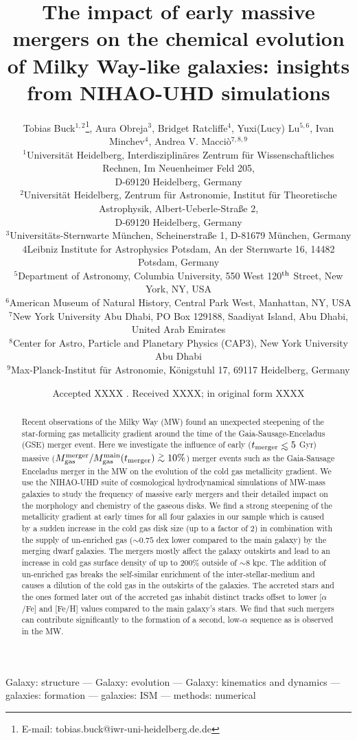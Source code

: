 \documentclass[useAMS,usenatbib]{mnras}
\title[Early massive accretion events in MW-mass galaxies]{The impact of early massive mergers on the chemical evolution of Milky Way-like galaxies: insights from NIHAO-UHD simulations}
\author[T. Buck] {Tobias Buck$^{1,2}$\thanks{E-mail: tobias.buck@iwr-uni-heidelberg.de.de}, Aura Obreja$^{3}$, Bridget Ratcliffe$^{4}$, Yuxi(Lucy) Lu$^{5, 6}$, 
\newauthor Ivan Minchev$^{4}$, Andrea V. Macci\`o$^{7,8,9}$ \\  %
%
$^1$Universit\"at Heidelberg, Interdisziplin\"ares Zentrum f\"ur Wissenschaftliches Rechnen, Im Neuenheimer Feld 205, \\ D-69120 Heidelberg, Germany\\
$^2$Universit\"at Heidelberg, Zentrum f\"ur Astronomie, Institut f\"ur Theoretische Astrophysik, Albert-Ueberle-Straße 2, \\ D-69120 Heidelberg, Germany\\
$^3$Universit\"ats-Sternwarte M\"unchen, Scheinerstraße 1, D-81679 M\"unchen, Germany\\
${4}$Leibniz Institute for Astrophysics Potsdam, An der Sternwarte 16, 14482 Potsdam, Germany\\
$^{5}$Department of Astronomy, Columbia University, 550 West 120$^{\rm th}$ Street, New York, NY, USA\\
$^{6}$American Museum of Natural History, Central Park West, Manhattan, NY, USA\\
$^7$New York University Abu Dhabi, PO Box 129188, Saadiyat Island, Abu Dhabi, United Arab Emirates\\
$^8$Center for Astro, Particle and Planetary Physics (CAP3), New York University Abu Dhabi\\
$^9$Max-Planck-Institut f\"ur Astronomie, K\"onigstuhl 17, 69117 Heidelberg, Germany
}
\newcommand{\gtsima}{$\; \buildrel > \over \sim \;$}
\newcommand{\gsim}{\lower.5ex\hbox{\gtsima}}
\def\lesssim{\mathrel{\hbox{\rlap{\hbox{\lower4pt\hbox{$\sim$}}}\hbox{$<$}}}}
\begin{document}
\date{Accepted XXXX . Received XXXX; in original form XXXX}

\pagerange{\pageref{firstpage}--\pageref{lastpage}} 

\maketitle

\label{firstpage}


\begin{abstract}
Recent observations of the Milky Way (MW) found an unexpected steepening of the star-forming gas metallicity gradient around the time of the Gaia-Sausage-Enceladus (GSE) merger event.
Here we investigate the influence of early ($t_{\rm{merger}}\lesssim5$ Gyr) massive ($M_{\rm{gas}}^{\rm{merger}}/M_{\rm{gas}}^{\rm{main}}(t_{\rm{merger}})\gsim10\%$) merger events such as the Gaia-Sausage Enceladus merger in the MW on the evolution of the cold gas metallicity gradient. We use the NIHAO-UHD suite of cosmological hydrodynamical simulations of MW-mass galaxies to study the frequency of massive early mergers and their detailed impact on the morphology and chemistry of the gaseous disks. 
We find a strong steepening of the metallicity gradient at early times for all four galaxies in our sample which is caused by a sudden increase in the cold gas disk size (up to a factor of 2) in combination with the supply of un-enriched gas ($\sim0.75$ dex lower compared to the main galaxy) by the merging dwarf galaxies.
The mergers mostly affect the galaxy outskirts and lead to an increase in cold gas surface density of up to 200\% outside of $\sim8$ kpc. The addition of un-enriched gas breaks the self-similar enrichment of the inter-stellar-medium and causes a dilution of the cold gas in the outskirts of the galaxies. 
The accreted stars and the ones formed later out of the accreted gas inhabit distinct tracks offset to lower [$\alpha$/Fe] and [Fe/H] values compared to the main galaxy's stars. We find that such mergers can contribute significantly to the formation of a second, low-$\alpha$ sequence as is observed in the MW.
\end{abstract}

\noindent
\begin{keywords}

Galaxy: structure --- Galaxy: evolution --- Galaxy: kinematics and dynamics --- galaxies:  formation --- galaxies: ISM --- methods: numerical
 \end{keywords}
\end{document}
